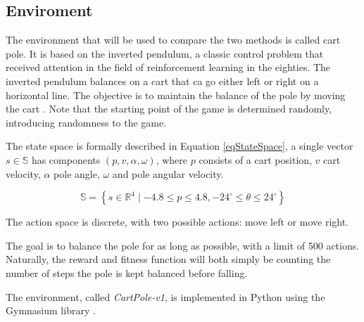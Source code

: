 \subsection{Enviroment}
\label{sec:Enviroment}
The environment that will be used to compare the two methods is called cart pole. It is based on the inverted pendulum, a classic control problem that received attention in the field of reinforcement learning in the eighties. 
The inverted pendulum balances on a cart that ca go either left or right on a horizontal line. 
The objective is to maintain the balance of the pole by moving the cart \cite{moriarty1996efficient}.
Note that the starting point of the game is determined randomly, introducing randomness to the game.

The state space is formally described in Equation \ref{eqStateSpace}, a single vector $s \in \mathbb{S}$ has components $(p, v, \alpha, \omega)$, where $p$ consists of a cart position, $v$ cart velocity, $\alpha$ pole angle, $\omega$ and pole angular velocity.

\begin{equation} \label{eqStateSpace}
{\mathbb{S} = \left\{ s \in \mathbb{R}^4 \mid -4.8 \leq p \leq 4.8, 
 -24^\circ \leq \theta \leq 24^\circ \right\}}
\end{equation}

The action space is discrete, with two possible actions: move left or move right. 

The goal is to balance the pole for as long as possible, with a limit of 500 actions.
Naturally, the reward and fitness function will both simply be counting the number of steps the pole is kept balanced before falling.

The environment, called \textit{CartPole-v1}, is implemented in Python using the Gymnasium library \cite{towers_gymnasium_2023}. 
